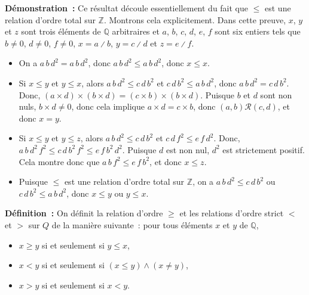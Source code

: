 \noindent\textbf{Démonstration :} Ce résultat découle essentiellement du fait que $\leq$ est une relation d'ordre total sur $\mathbb{Z}$.
    Montrons cela explicitement.
    Dans cette preuve, $x$, $y$ et $z$ sont trois éléments de $\mathbb{Q}$ arbitraires et $a$, $b$, $c$, $d$, $e$, $f$ sont six entiers tels que $b \neq 0$, $d \neq 0$, $f \neq 0$, $x = a \divslash b$, $y = c \divslash d$ et $z = e \divslash f$.
    \begin{itemize}[nosep]
        \item On a $a \, b \, d^2 = a \, b \, d^2$, donc $a \, b \, d^2 \leq a \, b \, d^2$, donc $x \leq x$.
        \item Si $x \leq y$ et $y \leq x$, alors $a \, b \, d^2 \leq c \, d \, b^2$ et $c \, d \, b^2 \leq a \, b \, d^2$, donc $a \, b \, d^2 = c \, d \, b^2$.
            Donc, $(a \times d) \times (b \times d) = (c \times b) \times (b \times d)$.
            Puisque $b$ et $d$ sont non nuls, $b \times d \neq 0$, donc cela implique $a \times d = c \times b$, donc $(a, b) \mathrel{\mathcal{R}} (c, d)$, et donc $x = y$.
        \item Si $x \leq y$ et $y \leq z$, alors $a \, b \, d^2 \leq c \, d \, b^2$ et $c \, d \, f^2 \leq e \, f \, d^2$.
            Donc, $a \, b \, d^2 \, f^2 \leq c \, d \, b^2 \, f^2 \leq e \, f \, b^2 \, d^2$.
            Puisque $d$ est non nul, $d^2$ est strictement positif.
            Cela montre donc que $a \, b \, f^2 \leq e \, f \, b^2$, et donc $x \leq z$.
        \item Puisque $\leq$ est une relation d'ordre total sur $\mathbb{Z}$, on a $a \, b \, d^2 \leq c \, d \, b^2$ ou $c \, d \, b^2 \leq a \, b \, d^2$, donc $x \leq y$ ou $y \leq x$.
    \end{itemize}

    \done

\medskip

\noindent\textbf{Définition :} On définit la relation d'ordre $\geq$ et les relations d'ordre strict $<$ et $>$ sur $Q$ de la manière suivante : pour tous éléments $x$ et $y$ de $\mathbb{Q}$, 
\begin{itemize}[nosep]
    \item $x \geq y$ si et seulement si $y \leq x$,
    \item $x < y$ si et seulement si $(x \leq y) \wedge (x \neq y)$,
    \item $x > y$ si et seulement si $x < y$.
\end{itemize}

\medskip


